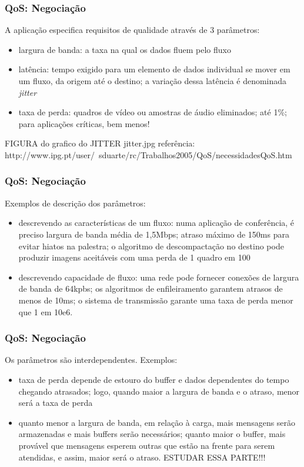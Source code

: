 \documentclass[]{beamer}
\begin{document}
\begin{frame}
  \frametitle{QoS: Negociação}
A aplicação especifica requisitos de qualidade através de 3 parâmetros: 
\begin{itemize}
  \item largura de banda: a taxa na qual os dados fluem pelo fluxo
  \item latência: tempo exigido para um elemento de dados individual se mover
em um fluxo, da origem até o destino; a variação dessa latência é denominada \emph{jitter}
  \item taxa de perda: quadros de vídeo ou amostras de áudio eliminados; até 1\%; 
para aplicações críticas, bem menos!
\end{itemize}
\end{frame}

\begin{frame}
 
FIGURA do grafico do JITTER
jitter.jpg
referência: http://www.ipg.pt/user/~sduarte/rc/Trabalhos2005/QoS/necessidadesQoS.htm

\end{frame}


\begin{frame}
  \frametitle{QoS: Negociação}
Exemplos de descrição dos parâmetros: 
\begin{itemize}
 \item descrevendo as características de um fluxo: numa aplicação de conferência,
é preciso largura de banda média de 1,5Mbps; atraso máximo
de 150ms para evitar hiatos na palestra; o algoritmo de descompactação
no destino pode produzir imagens aceitáveis com uma perda de 1 quadro em 100
  \item descrevendo capacidade de fluxo: uma rede pode fornecer conexões de largura de banda
de 64kpbs; os algoritmos de enfileiramento garantem atrasos de menos de 10ms; o sistema
de transmissão garante uma taxa de perda menor que 1 em 10e6.
\end{itemize}
\end{frame}

\begin{frame}
  \frametitle{QoS: Negociação}
Os parâmetros são interdependentes. Exemplos:
\begin{itemize}
  \item taxa de perda depende de estouro do buffer e dados dependentes do tempo
chegando atrasados; logo, quando maior a largura de banda e o atraso, menor será
a taxa de perda
  \item quanto menor a largura de banda, em relação à carga, 
mais mensagens serão armazenadas e mais buffers serão necessários; quanto maior o buffer,
mais provável que mensagens esperem outras que estão na frente para serem atendidas, e
assim, maior será o atraso. ESTUDAR ESSA PARTE!!!
\end{itemize}
\end{frame}
\end{document}

